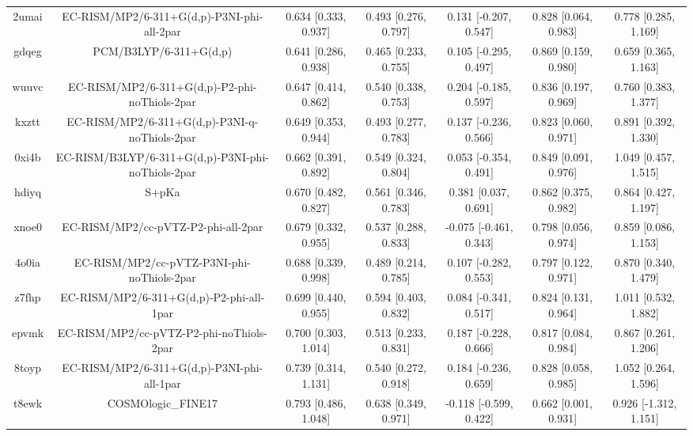 \documentclass{article}
\begin{document}
\begin{center}
\begin{longtable}{|ccccccc|}
 2umai &         EC-RISM/MP2/6-311+G(d,p)-P3NI-phi-all-2par &   0.634 [0.333, 0.937] &  0.493 [0.276, 0.797] &    0.131 [-0.207, 0.547] &  0.828 [0.064, 0.983] &   0.778 [0.285, 1.169] \\
 gdqeg &                             PCM/B3LYP/6-311+G(d,p) &   0.641 [0.286, 0.938] &  0.465 [0.233, 0.755] &    0.105 [-0.295, 0.497] &  0.869 [0.159, 0.980] &   0.659 [0.365, 1.163] \\
 wuuvc &      EC-RISM/MP2/6-311+G(d,p)-P2-phi-noThiols-2par &   0.647 [0.414, 0.862] &  0.540 [0.338, 0.753] &    0.204 [-0.185, 0.597] &  0.836 [0.197, 0.969] &   0.760 [0.383, 1.377] \\
 kxztt &      EC-RISM/MP2/6-311+G(d,p)-P3NI-q-noThiols-2par &   0.649 [0.353, 0.944] &  0.493 [0.277, 0.783] &    0.137 [-0.236, 0.566] &  0.823 [0.060, 0.971] &   0.891 [0.392, 1.330] \\
 0xi4b &  EC-RISM/B3LYP/6-311+G(d,p)-P3NI-phi-noThiols-2par &   0.662 [0.391, 0.892] &  0.549 [0.324, 0.804] &    0.053 [-0.354, 0.491] &  0.849 [0.091, 0.976] &   1.049 [0.457, 1.515] \\
 hdiyq &                                              S+pKa &   0.670 [0.482, 0.827] &  0.561 [0.346, 0.783] &     0.381 [0.037, 0.691] &  0.862 [0.375, 0.982] &   0.864 [0.427, 1.197] \\
 xnoe0 &                EC-RISM/MP2/cc-pVTZ-P2-phi-all-2par &   0.679 [0.332, 0.955] &  0.537 [0.288, 0.833] &   -0.075 [-0.461, 0.343] &  0.798 [0.056, 0.974] &   0.859 [0.086, 1.153] \\
 4o0ia &         EC-RISM/MP2/cc-pVTZ-P3NI-phi-noThiols-2par &   0.688 [0.339, 0.998] &  0.489 [0.214, 0.785] &    0.107 [-0.282, 0.553] &  0.797 [0.122, 0.971] &   0.870 [0.340, 1.479] \\
 z7fhp &           EC-RISM/MP2/6-311+G(d,p)-P2-phi-all-1par &   0.699 [0.440, 0.955] &  0.594 [0.403, 0.832] &    0.084 [-0.341, 0.517] &  0.824 [0.131, 0.964] &   1.011 [0.532, 1.882] \\
 epvmk &           EC-RISM/MP2/cc-pVTZ-P2-phi-noThiols-2par &   0.700 [0.303, 1.014] &  0.513 [0.233, 0.831] &    0.187 [-0.228, 0.666] &  0.817 [0.084, 0.984] &   0.867 [0.261, 1.206] \\
 8toyp &         EC-RISM/MP2/6-311+G(d,p)-P3NI-phi-all-1par &   0.739 [0.314, 1.131] &  0.540 [0.272, 0.918] &    0.184 [-0.236, 0.659] &  0.828 [0.058, 0.985] &   1.052 [0.264, 1.596] \\
 t8ewk &                                 COSMOlogic\_FINE17 &   0.793 [0.486, 1.048] &  0.638 [0.349, 0.971] &   -0.118 [-0.599, 0.422] &  0.662 [0.001, 0.931] &  0.926 [-1.312, 1.151] \\

\end{longtable}
\end{center}
\end{document}
